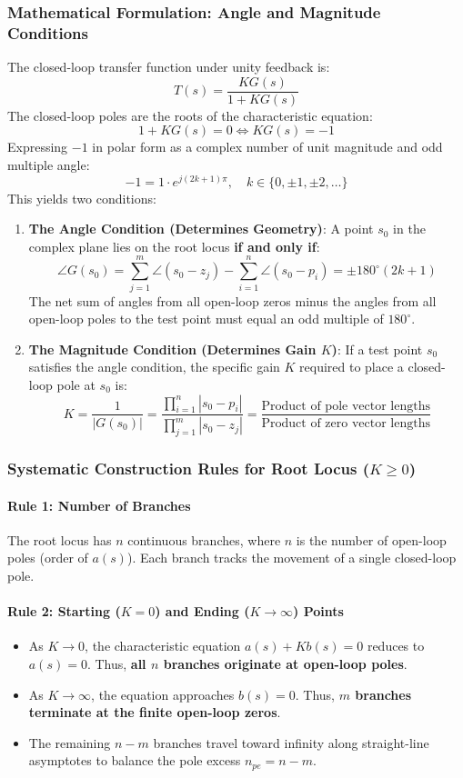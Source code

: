 \documentclass[12pt,onecolumn,twoside ]{article}
\begin{document}
	\subsubsection{Mathematical Formulation: Angle and Magnitude Conditions}
	The closed-loop transfer function under unity feedback is: \[
	T(s) = \frac{K G(s)}{1 + K G(s)}
	\] The closed-loop poles are the roots of the characteristic equation: \[
	1 + K G(s) = 0 \iff K G(s) = -1
	\]
	Expressing $-1$ in polar form as a complex number of unit magnitude and odd multiple angle: \[
	-1 = 1 \cdot e^{j(2k+1)\pi}, \quad k \in \{0, \pm 1, \pm 2, \dots\}
	\]
	This yields two conditions:
	\begin{enumerate}
		\item
		\textbf{The Angle Condition (Determines Geometry)}: A point $s_0$ in the complex plane lies on the root locus \textbf{if and only if}: \[
		\angle G(s_0) = \sum_{j=1}^{m} \angle(s_0 - z_j) - \sum_{i=1}^{n} \angle(s_0 - p_i) = \pm 180^\circ(2k + 1)
		\] The net sum of angles from all open-loop zeros minus the angles from all open-loop poles to the test point must equal an odd multiple of $180^\circ$.
		\item
		\textbf{The Magnitude Condition (Determines Gain $K$)}: If a test point $s_0$ satisfies the angle condition, the specific gain $K$ required to place a closed-loop pole at $s_0$ is: \[
		K = \frac{1}{|G(s_0)|} = \frac{\prod_{i=1}^{n} |s_0 - p_i|}{\prod_{j=1}^{m} |s_0 - z_j|} = \frac{\text{Product of pole vector lengths}}{\text{Product of zero vector lengths}}
		\]
	\end{enumerate}
	
	\subsubsection{Systematic Construction Rules for Root Locus ($K \ge 0$)}
	\paragraph{Rule 1: Number of Branches}
	The root locus has $n$ continuous branches, where $n$ is the number of open-loop poles (order of $a(s)$). Each branch tracks the movement of a single closed-loop pole.
	\paragraph{Rule 2: Starting ($K = 0$) and Ending ($K \to \infty$) Points}
	\begin{itemize}
		\item
		As $K \to 0$, the characteristic equation $a(s) + K b(s) = 0$ reduces to $a(s) = 0$. Thus, \textbf{all $n$ branches originate at open-loop poles}.
		\item
		As $K \to \infty$, the equation approaches $b(s) = 0$. Thus, \textbf{$m$ branches terminate at the finite open-loop zeros}.
		\item
		The remaining $n - m$ branches travel toward infinity along straight-line asymptotes to balance the pole excess $n_{pe} = n - m$.
	\end{itemize}
\end{document}
